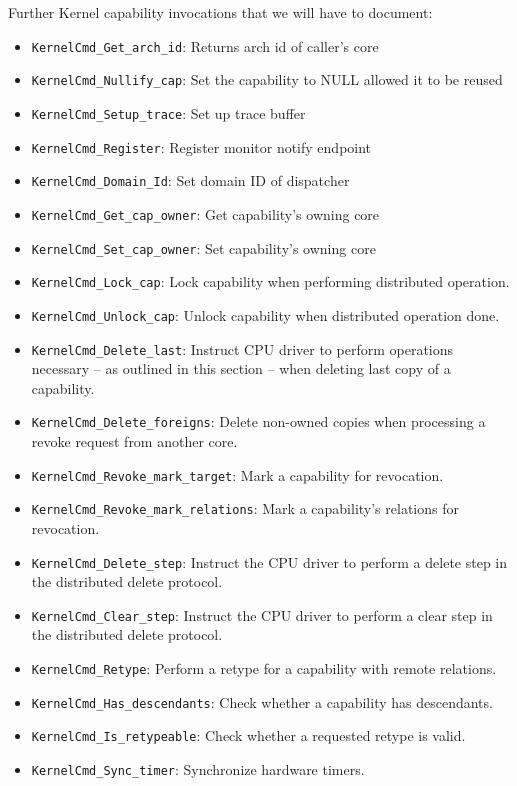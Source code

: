 Further Kernel capability invocations that we will have to document:
\begin{itemize}
  \item \verb|KernelCmd_Get_arch_id|: Returns arch id of caller's core
  \item \verb|KernelCmd_Nullify_cap|: Set the capability to NULL allowed it to be reused
  \item \verb|KernelCmd_Setup_trace|: Set up trace buffer
  \item \verb|KernelCmd_Register|: Register monitor notify endpoint
  \item \verb|KernelCmd_Domain_Id|: Set domain ID of dispatcher
  \item \verb|KernelCmd_Get_cap_owner|: Get capability's owning core
  \item \verb|KernelCmd_Set_cap_owner|: Set capability's owning core
  \item \verb|KernelCmd_Lock_cap|: Lock capability when performing distributed
    operation.
  \item \verb|KernelCmd_Unlock_cap|: Unlock capability when distributed
    operation done.
  \item \verb|KernelCmd_Delete_last|: Instruct CPU driver to perform
    operations necessary -- as outlined in this section -- when deleting last
    copy of a capability.
  \item \verb|KernelCmd_Delete_foreigns|: Delete non-owned copies when
    processing a revoke request from another core.
  \item \verb|KernelCmd_Revoke_mark_target|: Mark a capability for revocation.
  \item \verb|KernelCmd_Revoke_mark_relations|: Mark a capability's relations
    for revocation.
  \item \verb|KernelCmd_Delete_step|: Instruct the CPU driver to perform a
    delete step in the distributed delete protocol.
  \item \verb|KernelCmd_Clear_step|: Instruct the CPU driver to perform a
    clear step in the distributed delete protocol.
  \item \verb|KernelCmd_Retype|: Perform a retype for a capability with remote
    relations.
  \item \verb|KernelCmd_Has_descendants|: Check whether a capability has
    descendants.
  \item \verb|KernelCmd_Is_retypeable|: Check whether a requested retype is
    valid.
  \item \verb|KernelCmd_Sync_timer|: Synchronize hardware timers.

\end{itemize}
